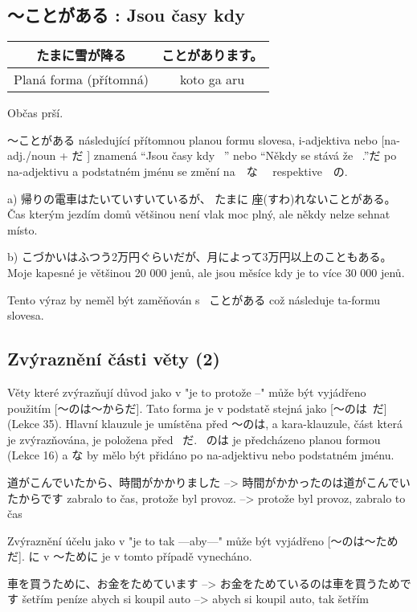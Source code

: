 \subsection{ 〜ことがある : Jsou časy kdy ~}
\begin{center}
\begin{tabular}{|c|c|}
\hline
たまに雪が降る&ことがあります。 \\
\hline
Planá forma (přítomná)&koto ga aru\\
\hline
\end{tabular}
\end{center}
Občas prší.


〜ことがある následující přítomnou planou formu slovesa, i-adjektiva nebo  [na-adj./noun + だ ] znamená “Jsou časy kdy ~” nebo “Někdy se stává že ~.”だ po na-adjektivu a podstatném jménu se změní na　な　 respektive　の. 

a) 帰りの電車はたいていすいているが、 たまに 座(すわ)れないことがある。Čas kterým jezdím domů většinou není vlak moc plný, ale někdy nelze sehnat místo.

b) こづかいはふつう2万円ぐらいだが、月によって3万円以上のこともある。Moje kapesné je většinou 20 000 jenů, ale jsou měsíce kdy je to více 30 000 jenů.



Tento výraz by neměl být zaměňován  s  ~ことがある což následuje ta-formu slovesa.
\subsection{ Zvýraznění části věty (2)}

Věty které zvýrazňují důvod jako v "je to protože --" může být vyjádřeno použitím  [〜のは〜からだ]. Tato forma je v podstatě stejná jako  [〜のは~だ] (Lekce 35). Hlavní klauzule je umístěna před 〜のは, a kara-klauzule, část která je zvýrazňována, je položena před ~だ. ~のは je předcházeno planou formou (Lekce 16) a な by mělo být přidáno po na-adjektivu nebo podstatném jménu.

道がこんでいたから、時間がかかりました –> 時間がかかったのは道がこんでいたからです
zabralo to čas, protože byl provoz. –> protože byl provoz, zabralo to čas


Zvýraznění účelu jako v "je to tak ---aby---" může být vyjádřeno  [〜のは〜ため だ].  に v 〜ために je v tomto případě vynecháno.

車を買うために、お金をためています –> お金をためているのは車を買うためです
šetřím peníze abych si koupil auto  –> abych si koupil auto, tak šetřím


